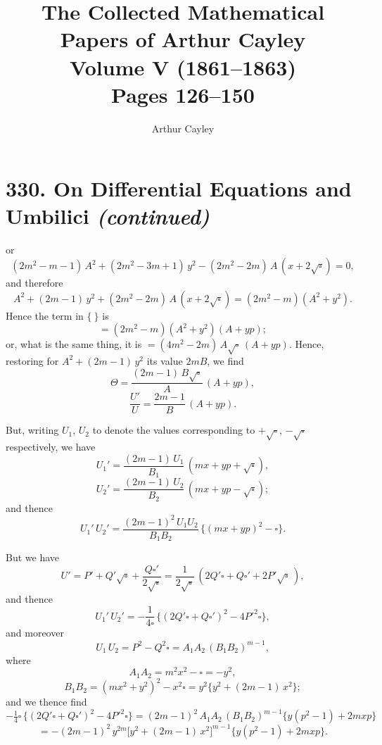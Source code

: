 \documentclass[11pt,a4paper]{article}
\title{\textbf{The Collected Mathematical Papers of Arthur Cayley}\\[6pt]
\Large Volume V (1861--1863)\\[12pt]
\large Pages 126--150}
\author{Arthur Cayley}
\date{}
\theoremstyle{plain}
\begin{document}
\maketitle
\thispagestyle{empty}
\newpage
\setcounter{page}{126}

\section*{330. On Differential Equations and Umbilici \textit{(continued)}}


\medskip

\noindent or
\[
(2m^2 - m - 1)\,A^2 + (2m^2 - 3m + 1)\,y^2 - (2m^2 - 2m)\,A\,(x + 2\sqrt{\square}) = 0,
\]
and therefore
\[
A^2 + (2m - 1)\,y^2 + (2m^2 - 2m)\,A\,(x + 2\sqrt{\square}) = (2m^2 - m)(A^2 + y^2).
\]
Hence the term in $\{\ \}$ is
\[
= (2m^2 - m)(A^2 + y^2)(A + yp);
\]
or, what is the same thing, it is $= (4m^2 - 2m)\,A\sqrt{\square}\,(A + yp)$. Hence, restoring for $A^2 + (2m - 1)\,y^2$ its value $2mB$, we find
\[
\Theta = \frac{(2m - 1)\,B\sqrt{\square}}{A}\,(A + yp),
\]
\[
\frac{U'}{U} = \frac{2m - 1}{B}\,(A + yp).
\]

But, writing $U_1$, $U_2$ to denote the values corresponding to $+\sqrt{\square}$, $-\sqrt{\square}$ respectively, we have
\[
U_1' = \frac{(2m - 1)\,U_1}{B_1}\,(mx + yp + \sqrt{\square}),
\]
\[
U_2' = \frac{(2m - 1)\,U_2}{B_2}\,(mx + yp - \sqrt{\square});
\]
and thence
\[
U_1'\,U_2' = \frac{(2m - 1)^2\,U_1 U_2}{B_1 B_2}\,\bigl\{(mx + yp)^2 - \square\bigr\}.
\]

But we have
\[
U' = P' + Q'\sqrt{\square} + \frac{Q\square'}{2\sqrt{\square}} = \frac{1}{2\sqrt{\square}}\,(2Q'\square + Q\square' + 2P'\sqrt{\square}\,),
\]
and thence
\[
U_1'\,U_2' = -\frac{1}{4\square}\,\bigl\{(2Q'\square + Q\square')^2 - 4P'^2\square\bigr\},
\]
and moreover
\[
U_1\,U_2 = P^2 - Q^2\square = A_1 A_2\,(B_1 B_2)^{m-1},
\]
where
\[
A_1 A_2 = m^2 x^2 - \square = -y^2,
\]
\[
B_1 B_2 = (m x^2 + y^2)^2 - x^2 \square = y^2\{y^2 + (2m - 1)\,x^2\};
\]
and we thence find
\[
-\tfrac{1}{4}\square\,\bigl\{(2Q'\square + Q\square')^2 - 4P'^2\square\bigr\}
 = (2m - 1)^2\,A_1 A_2\,(B_1 B_2)^{m-1}\{y(p^2 - 1) + 2mxp\}
\]
\[
= -(2m - 1)^2\,y^{2m}\bigl[y^2 + (2m - 1)\,x^2\bigr]^{m-1}\{y(p^2 - 1) + 2mxp\}.
\]
\end{document}
